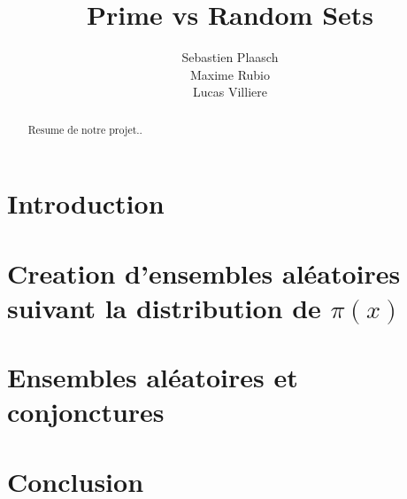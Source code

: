 \documentclass{article}
\begin{document}
\author{Sebastien Plaasch \\ Maxime Rubio  \\ Lucas Villiere}
\title{Prime vs Random Sets}
\maketitle
\newpage 
\begin{abstract}
    Resume de notre projet..
\end{abstract}
\newpage
\tableofcontents


\newpage

\section*{Introduction}
    \label{sec:intro}


\section{Creation d'ensembles aléatoires suivant la distribution de $\pi(x)$}
    \label{sec:sec1}
    
    
    

\section{Ensembles aléatoires et conjonctures}
    

\section*{Conclusion}
    

\newpage
\printindex
\end{document}
